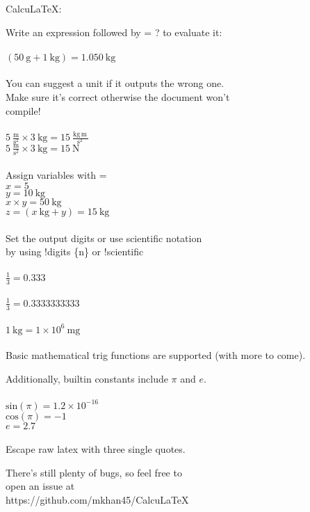 \documentclass{article}
\begin{document}
CalcuLaTeX:

Write an expression followed by = ? to evaluate it:
\\\\$(50\ \mathrm{\mathrm{g }} + 1\ \mathrm{\mathrm{kg}}) = 1.050 \ \mathrm{k g\,}$\\
\\
You can suggest a unit if it outputs the wrong one. \\
Make sure it's correct otherwise the document won't \\
compile!
\\\\$5\ \mathrm{\mathrm{\frac{\mathrm{m}}{\mathrm{\mathrm{s}^{2}}}}} \times 3\ \mathrm{\mathrm{kg}} = 15 \ \mathrm{\frac{k g\, m\,}{ s^{2}\,}}$\\
$5\ \mathrm{\mathrm{\frac{\mathrm{m}}{\mathrm{\mathrm{s}^{2}}}}} \times 3\ \mathrm{\mathrm{kg}} = 15 \ \mathrm{N}$\\
\\
Assign variables with =
\\$x = 5$\\
$y = 10\ \mathrm{\mathrm{kg}}$\\
$x \times y = 50 \ \mathrm{k g\,}$\\
$z = (x\ \mathrm{\mathrm{kg}} + y) = 15 \ \mathrm{k g\,}$\\
\\
Set the output digits or use scientific notation \\
by using !digits \{n\} or !scientific
\\\\$\frac{1}{3} = 0.333$\\
\\$\frac{1}{3} = 0.3333333333$\\
\\$1\ \mathrm{\mathrm{kg}} = 1 \times 10^{6} \ \mathrm{mg}$\\
\\
Basic mathematical trig functions are supported (with more to come).

Additionally, builtin constants include $\pi$ and $e$.
\\\\$\text{sin}(\pi) = 1.2\times 10^{-16}$\\
$\text{cos}(\pi) = -1$\\
$e = 2.7$\\
\\
Escape raw latex with three single quotes.

There's still plenty of bugs, so feel free to \\
open an issue at \\
https://github.com/mkhan45/CalcuLaTeX
\\
\end{document}
